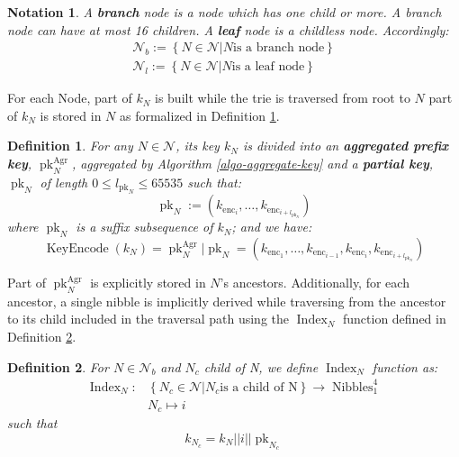 \documentclass{article}
\newcommand{\assign}{:=}
\newcommand{\tmop}[1]{\ensuremath{\operatorname{#1}}}
\newcommand{\tmstrong}[1]{\textbf{#1}}
\newcommand{\tmtextbf}[1]{{\bfseries{#1}}}
\newtheorem{definition}{Definition}
\newtheorem{notation}{Notation}
\providecommand{\tmop}[1]{\ensuremath{\mathrm{#1}}}
\providecommand{\tmstrong}[1]{\tmtextbf{#1}}
\providecommand{\tmtextbf}[1]{\tmtextbf{#1}}
\newtheorem{definition}{Definition}
\newtheorem{notation}{Notation}
\begin{document}
\begin{notation}
  A {\tmstrong{branch}} node is a node which has one child or more. A branch
  node can have at most 16 children. A {\tmstrong{leaf}} node is a childless
  node. Accordingly:
  \[ \begin{array}{c}
       \mathcal{N}_b \assign \left\{ N \in \mathcal{N}|N \text{is a branch
       node} \right\}\\
       \mathcal{N}_l \assign \left\{ N \in \mathcal{N}|N \text{is a leaf node}
       \right\}
     \end{array} \]
\end{notation}

For each Node, part of $k_N$ is built while the trie is traversed from root to
$N$ part of $k_N$ is stored in $N$ as formalized in Definition
\ref{defn-node-key}.

\begin{definition}
  \label{defn-node-key}For any $N \in \mathcal{N}$, its key $k_N$ is divided
  into an {\tmstrong{aggregated prefix key}},
  {\tmstrong{$\tmop{pk}_N^{\tmop{Agr}}$}}, aggregated by Algorithm
  \ref{algo-aggregate-key} and a {\tmstrong{partial key}},
  {\tmstrong{$\tmop{pk}_N$}} of length $0 \leqslant l_{\tmop{pk}_N} \leqslant
  65535$ such that:
  \[ \tmop{pk}_N \assign (k_{\tmop{enc}_i}, \ldots, k_{\tmop{enc}_{i +
     l_{\tmop{pk}_N}}}) \]
  where $\tmop{pk}_N$ is a suffix subsequence of $k_N$; and we have:
  \[ \tmop{KeyEncode} (k_N) = \tmop{pk}_N^{\tmop{Agr}} | \tmop{pk}_N =
     (k_{\tmop{enc}_1}, \ldots, k_{\tmop{enc}_{i - 1}}, k_{\tmop{enc}_i},
     k_{\tmop{enc}_{i + l_{\tmop{pk}_N}}}) \]
\end{definition}

Part of $\tmop{pk}_N^{\tmop{Agr}}$ is explicitly stored in $N$'s ancestors.
Additionally, for each ancestor, a single nibble is implicitly derived while
traversing from the ancestor to its child included in the traversal path using
the $\tmop{Index}_N$ function defined in Definition \ref{defn-index-function}.

\begin{definition}
  \label{defn-index-function}For $N \in \mathcal{N}_b$ and $N_c$ child of N,
  we define {\tmstrong{$\tmop{Index}_N$}} function as:
  \[ \begin{array}{cc}
       \tmop{Index}_N : & \left\{ N_c \in \mathcal{N}|N_c  \text{is a child of
       N} \right\} \rightarrow \tmop{Nibbles}^4_1\\
       & N_c \mapsto i_{}
     \end{array} \]
  such that
  \[ k_{N_c} = k_N | | i | | \tmop{pk}_{N_c} \]
\end{definition}
\end{document}
